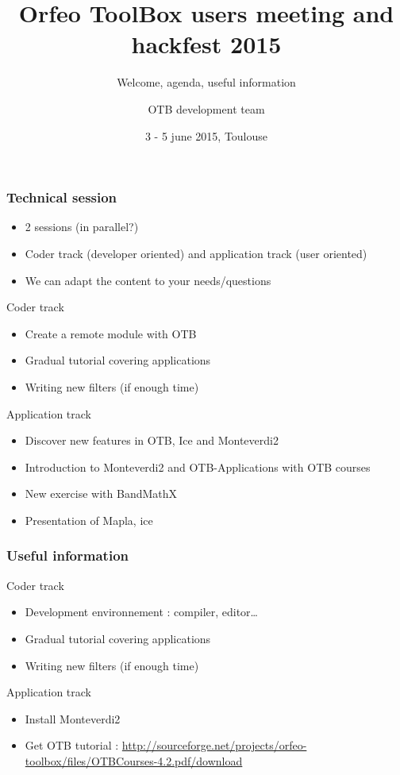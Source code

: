 \documentclass[8pt]{beamer}
\title{Orfeo ToolBox users meeting and hackfest 2015}
\subtitle{Welcome, agenda, useful information}
\author{OTB development team}%
\date{3 - 5 june 2015, Toulouse}
\begin{document}
\begin{frame}
\titlepage
\end{frame}

\begin{frame}
\frametitle{Technical session}
\begin{itemize}
\item 2 sessions (in parallel?)
\item Coder track (developer oriented) and application track (user oriented)
\item We can adapt the content to your needs/questions 
\end{itemize}

\begin{block}{Coder track}
\begin{itemize}
\item Create a remote module with OTB
\item Gradual tutorial covering applications 
\item Writing new filters (if enough time)
\end{itemize} 
\end{block}

\begin{block}{Application track}
\begin{itemize}
\item Discover new features in OTB, Ice and Monteverdi2
\item Introduction to Monteverdi2 and OTB-Applications with OTB courses
\item New exercise with BandMathX
\item Presentation of Mapla, ice
\end{itemize} 
\end{block}

\end{frame}

\begin{frame}
\frametitle{Useful information}
\begin{block}{Coder track}
\begin{itemize}
\item Development environnement : compiler, editor\ldots
\item Gradual tutorial covering applications 
\item Writing new filters (if enough time)
\end{itemize} 
\end{block}

\begin{block}{Application track}
\begin{itemize}
\item Install Monteverdi2   
\item Get OTB tutorial : \href{http://sourceforge.net/projects/orfeo-toolbox/files/OTBCourses-4.2.pdf/download}{http://sourceforge.net/projects/orfeo-toolbox/files/OTBCourses-4.2.pdf/download}
\end{itemize} 
\end{block}

\end{frame}
\end{document}
